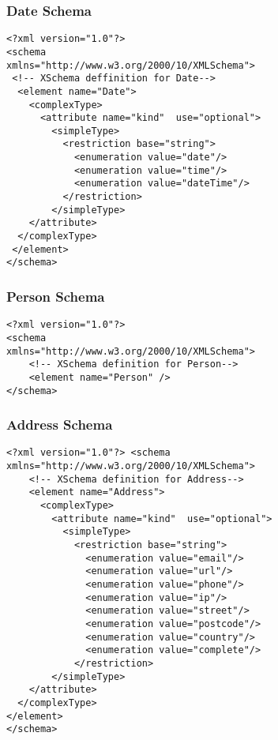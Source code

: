 \subsubsection*{Date Schema}
\begin{small}
\begin{verbatim}
<?xml version="1.0"?>
<schema
xmlns="http://www.w3.org/2000/10/XMLSchema">
 <!-- XSchema deffinition for Date-->
  <element name="Date">
    <complexType>
      <attribute name="kind"  use="optional">
        <simpleType>
          <restriction base="string">
            <enumeration value="date"/>
            <enumeration value="time"/>
            <enumeration value="dateTime"/>
          </restriction>
        </simpleType>
    </attribute>
  </complexType>
 </element>
</schema>
\end{verbatim}
\end{small}

\subsubsection*{Person Schema}
\begin{small}
\begin{verbatim}
<?xml version="1.0"?>
<schema
xmlns="http://www.w3.org/2000/10/XMLSchema">
    <!-- XSchema definition for Person-->
    <element name="Person" />
</schema>
\end{verbatim}
\end{small}

\subsubsection*{Address Schema}
\begin{small}
\begin{verbatim}
<?xml version="1.0"?> <schema
xmlns="http://www.w3.org/2000/10/XMLSchema">
    <!-- XSchema definition for Address-->
    <element name="Address">
      <complexType>
        <attribute name="kind"  use="optional">
          <simpleType>
            <restriction base="string">
              <enumeration value="email"/>
              <enumeration value="url"/>
              <enumeration value="phone"/>
              <enumeration value="ip"/>
              <enumeration value="street"/>
              <enumeration value="postcode"/>
              <enumeration value="country"/>
              <enumeration value="complete"/>
            </restriction>
        </simpleType>
    </attribute>
  </complexType>
</element>
</schema>
\end{verbatim}
\end{small}
\nnormalsize


